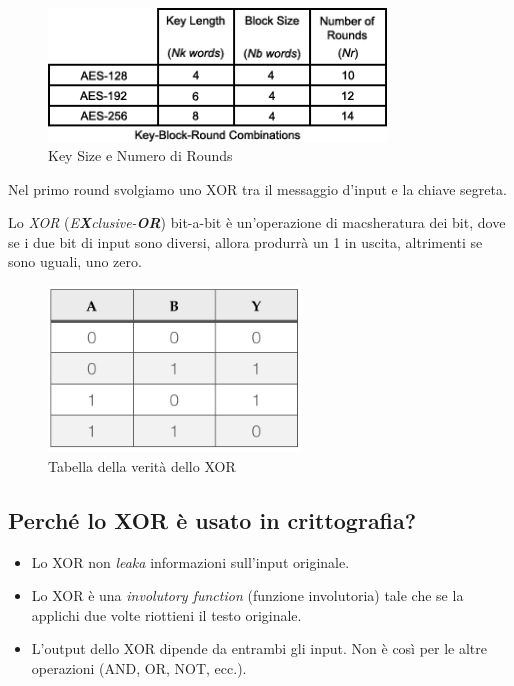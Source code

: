 \begin{figure}[H]
	\centering
	\includegraphics[width=0.8\textwidth, height=0.8\textheight, keepaspectratio]{./images/aes/key_size_and_number_of_rounds.png}
	\caption{Key Size e Numero di Rounds}
	\label{fig:aes_key_size_number_of_rounds}
\end{figure}


\textsf{\small Nel primo round svolgiamo uno XOR tra il messaggio d'input e la chiave segreta.}

\textsf{\small Lo \emph{XOR} (\emph{E\textbf{X}clusive-\textbf{OR}}) bit-a-bit è un'operazione di macsheratura dei bit, dove se i due bit di input sono diversi, allora produrrà un 1 in uscita, altrimenti se sono uguali, uno zero.} 

\begin{figure}[H]
	\centering
	\includegraphics[width=0.6\textwidth, height=0.6\textheight, keepaspectratio]{./images/XOR/XOR-Truth-Table.png}
	\caption{Tabella della verità dello XOR}
	\label{fig:xor_truth_table}
\end{figure}

\subsection{Perché lo XOR è usato in crittografia?}

   

\begin{itemize}
	\item \textsf{\small Lo XOR non \emph{leaka} informazioni sull'input originale.} %
	\item \textsf{\small Lo XOR è una \emph{involutory function} (funzione involutoria) tale che se la applichi due volte riottieni il testo originale.}
	\item \textsf{\small L'output dello XOR dipende da entrambi gli input. Non è così per le altre operazioni (AND, OR, NOT, ecc.).}
\end{itemize}

